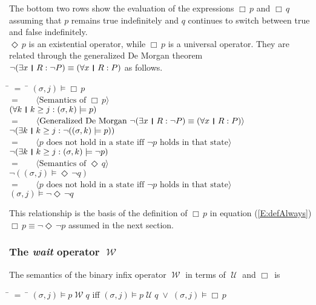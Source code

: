 \documentclass[fleqn, leqno]{article}
\newcommand{\lgap}{2pt}                             %
\newcommand{\mymathindent}{24pt}                    %
\newcommand{\Until}{\;\mathcal{U}\;}
\newcommand{\Wait}{\;\mathcal{W}\;}
\newcommand{\Event}{\Diamond\,}
\newcommand{\Always}{\Box\,}
\newcommand{\thedr}{\rule[-.25ex]{.32mm}{1.75ex}}   %
\newcommand{\dr}{\;\,\thedr\,\;}                    %
\newcommand{\rb}{:}                                 %
\newcommand{\all}{\forall}                          %
\newcommand{\ext}{\exists}                          %
\newcommand{\Gll} {\langle}                         %
\newcommand{\Ggg} {\rangle}                         %
\newcommand{\Hint}[1]     {\ \ \ $\Gll              \mbox{#1} \Ggg$ }   %
\begin{document}
The bottom two rows show the evaluation of the expressions $\Always p$ and $\Always q$
assuming that $p$ remains true indefinitely and $q$ continues to switch between true and false indefinitely.\\

$\Event p$ is an existential operator, while $\Always p$ is a universal operator.
They are related through the generalized De Morgan theorem \cite{LADM} $\neg (\ext x\dr R\rb \neg P)\equiv (\all x\dr R\rb P)$
as follows.

\begin{tabbing}
\hspace{\mymathindent} \= $= \;$ \= \kill
	\> \>   $(\sigma, j) \models \Always p$\\[\lgap]
	\> $=$  \>  \Hint{Semantics of $\Always p$}\\[\lgap]
	\> \>   $(\all k \dr k \ge j \rb (\sigma,k) \models p)$\\[\lgap]
	\> $=$  \>  \Hint{Generalized De Morgan $\neg (\ext x\dr R\rb \neg P)\equiv (\all x\dr R\rb P)$}\\[\lgap]
	\> \>   $\neg (\ext k \dr k \ge j \rb \neg((\sigma,k) \models p))$\\[\lgap]
	\> $=$  \>  \Hint{$p$ does not hold in a state iff $\neg p$ holds in that state}\\[\lgap]
	\> \>   $\neg (\ext k \dr k \ge j \rb (\sigma,k) \models \neg p)$\\[\lgap]
	\> $=$  \>  \Hint{Semantics of $\Event q$}\\[\lgap]
	\> \>   $\neg ((\sigma, j) \models \Event \neg q)$\\[\lgap]
	\> $=$  \>  \Hint{$p$ does not hold in a state iff $\neg p$ holds in that state}\\[\lgap]
	\> \>   $(\sigma, j) \models \neg \Event \neg q$
\end{tabbing}

This relationship is the basis of the definition of $\Always p$ in equation (\ref{E:defAlways})
$\Always p \equiv \lnot\Event\lnot p$ assumed in the next section.

\subsubsection*{The \textit{wait} operator $\Wait$}

The semantics of the binary infix operator $\Wait$ in terms of $\Until$ and $\Always$ is

\begin{tabbing}
\hspace{\mymathindent} \= $= \;$ \= \kill
  \> $(\sigma, j) \models p \Wait q$ \quad iff \quad $(\sigma, j) \models p \Until q \; \lor \; (\sigma, j) \models \Always p$
\end{tabbing}
\end{document}
